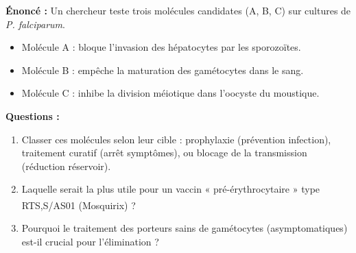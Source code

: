 \documentclass[11pt]{article}
\begin{document}
\begin{exoresolu}
\textbf{Énoncé :} Un chercheur teste trois molécules candidates (A, B, C) sur cultures de \emph{P. falciparum}.
\begin{itemize}
    \item Molécule A : bloque l'invasion des hépatocytes par les sporozoïtes.
    \item Molécule B : empêche la maturation des gamétocytes dans le sang.
    \item Molécule C : inhibe la division méiotique dans l'oocyste du moustique.
\end{itemize}
\textbf{Questions :}
\begin{enumerate}
    \item Classer ces molécules selon leur cible : prophylaxie (prévention infection), traitement curatif (arrêt symptômes), ou blocage de la transmission (réduction réservoir).
    \item Laquelle serait la plus utile pour un vaccin « pré-érythrocytaire » type RTS,S/AS01 (Mosquirix\textsuperscript{\textregistered}) ?
    \item Pourquoi le traitement des porteurs sains de gamétocytes (asymptomatiques) est-il crucial pour l'élimination ?
\end{enumerate}


\end{exoresolu}
\end{document}
